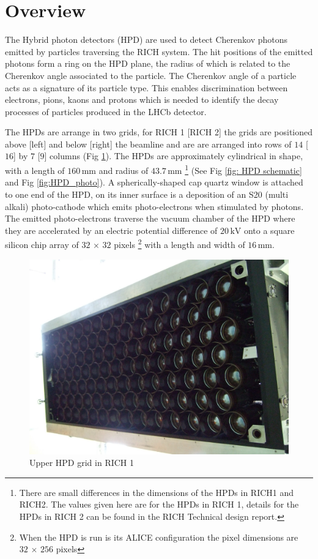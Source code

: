 \section{Overview}

The Hybrid photon detectors (HPD) are used to detect Cherenkov photons emitted by particles traversing the RICH system. The hit positions of the emitted photons form a ring on the HPD plane, the radius of which is related to the Cherenkov angle associated to the particle. The Cherenkov angle of a particle acts as a signature of its particle type. This enables discrimination between electrons, pions, kaons and protons which is needed to identify the decay processes of particles produced in the LHCb detector. 

The HPDs are arrange in two grids, for RICH 1 [RICH 2] the grids are positioned above [left] and below [right] the beamline and are are arranged into rows of $14$ [$16$] by $7$ [$9$] columns (Fig \ref{fig: RICH 1: upper grid}). The HPDs are approximately cylindrical in shape, with a length of $160\,\mathrm{mm}$ and radius of $43.7\,\mathrm{mm}$ \footnote{There are small differences in the dimensions of the HPDs in RICH1 and RICH2. The values given here are for the HPDs in RICH 1, details for the HPDs in RICH 2 can be found in the RICH Technical design report.} (See Fig \ref{fig: HPD schematic} and Fig \ref{fig:HPD_photo}). A spherically-shaped cap quartz window is attached to one end of the HPD, on its inner surface is a deposition of an S20 (multi alkali) photo-cathode which emits photo-electrons when stimulated by photons. The emitted photo-electrons traverse the vacuum chamber of the HPD where they are accelerated by an electric potential difference of $20\,\mathrm{kV}$ onto a square silicon chip array of $32\,\times\,32$ pixels \footnote{When the HPD is run is its ALICE configuration the pixel dimensions are $32\,\times\,256$ pixels} with a length and width of $16\,\mathrm{mm}$.

\begin{figure}
	\begin{center}
		\includegraphics[width=0.5\columnwidth]{./Chapters/hpd_alignment/images/RICH1_Upper_box_134.jpg}
		\caption{Upper HPD grid in RICH 1}
		\label{fig: RICH 1: upper grid}
	\end{center}
\end{figure}

